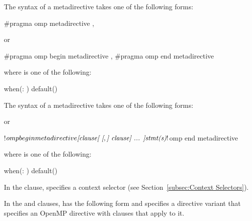 \syntax
\begin{ccppspecific}
The syntax of a metadirective takes one of the
following forms:
\begin{ompcPragma}
#pragma omp metadirective \plc{[clause[ [},\plc{] clause] ... ] new-line}
\end{ompcPragma}
or
\begin{ompcPragma}
#pragma omp begin metadirective \plc{[clause[ [},\plc{] clause] ... ] new-line}
#pragma omp end metadirective
\end{ompcPragma}


\begin{samepage}
where  is one of the following:
\begin{indentedcodelist}
when(: )
default()
\end{indentedcodelist}
\end{samepage}

\end{ccppspecific}

\begin{fortranspecific}
The syntax of a metadirective takes one of the following forms:


or

\begin{ompfPragma}
!$omp begin metadirective \plc{[clause[ [},\plc{] clause] ... ]}
!$omp end metadirective
\end{ompfPragma}

\begin{samepage}
where  is one of the following:

\begin{indentedcodelist}
when(: )
default()
\end{indentedcodelist}
\end{samepage}

\end{fortranspecific}

In the  clause,  specifies a context
selector (see Section~\ref{subsec:Context Selectors}).


In the  and  clauses, 
has the following form and specifies a directive variant that specifies an OpenMP
directive with clauses that apply to it.

